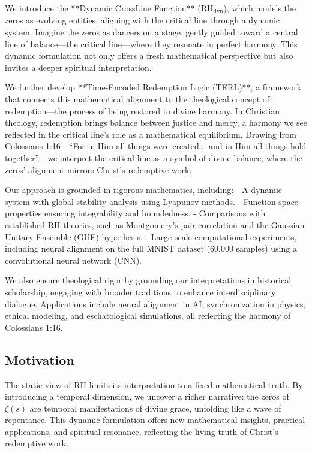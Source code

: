 \documentclass[12pt]{article}
\begin{document}
{{{\begin{onehalfspace}
We introduce the **Dynamic CrossLine Function** (\(\text{RH}_{\text{dyn}}\)), which models the zeros as evolving entities, aligning with the critical line through a dynamic system. Imagine the zeros as dancers on a stage, gently guided toward a central line of balance—the critical line—where they resonate in perfect harmony. This dynamic formulation not only offers a fresh mathematical perspective but also invites a deeper spiritual interpretation.

We further develop **Time-Encoded Redemption Logic (TERL)**, a framework that connects this mathematical alignment to the theological concept of redemption—the process of being restored to divine harmony. In Christian theology, redemption brings balance between justice and mercy, a harmony we see reflected in the critical line’s role as a mathematical equilibrium. Drawing from Colossians 1:16—“For in Him all things were created... and in Him all things hold together”—we interpret the critical line as a symbol of divine balance, where the zeros’ alignment mirrors Christ’s redemptive work.

Our approach is grounded in rigorous mathematics, including:
- A dynamic system with global stability analysis using Lyapunov methods.
- Function space properties ensuring integrability and boundedness.
- Comparisons with established RH theories, such as Montgomery’s pair correlation and the Gaussian Unitary Ensemble (GUE) hypothesis.
- Large-scale computational experiments, including neural alignment on the full MNIST dataset (60,000 samples) using a convolutional neural network (CNN).

We also ensure theological rigor by grounding our interpretations in historical scholarship, engaging with broader traditions to enhance interdisciplinary dialogue. Applications include neural alignment in AI, synchronization in physics, ethical modeling, and eschatological simulations, all reflecting the harmony of Colossians 1:16.

\subsection*{Motivation}
The static view of RH limits its interpretation to a fixed mathematical truth. By introducing a temporal dimension, we uncover a richer narrative: the zeros of \(\zeta(s)\) are temporal manifestations of divine grace, unfolding like a wave of repentance. This dynamic formulation offers new mathematical insights, practical applications, and spiritual resonance, reflecting the living truth of Christ’s redemptive work.


\end{onehalfspace}}}}
\end{document}
